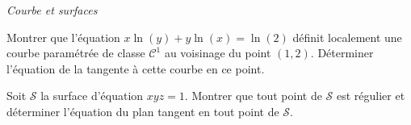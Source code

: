 \documentclass[a4paper,10pt]{report}
\begin{document}
\begin{center}
\textit{{ {\large Courbe et surfaces}}}
\end{center}

\medskip

\begin{Exa} Montrer que l'équation $x\ln(y)+y \ln(x) = \ln(2)$ définit localement une courbe paramétrée de classe $\mathcal{C}^1$ au voisinage du point $(1,2)$. Déterminer l'équation de la tangente à cette courbe en ce point.
\end{Exa}


\begin{Exa} Soit $\mathcal{S}$ la surface d'équation $xyz=1$. Montrer que tout point de $\mathcal{S}$ est régulier et déterminer l'équation du plan tangent en tout point de $\mathcal{S}$.
\end{Exa}

%
%
\end{document}
